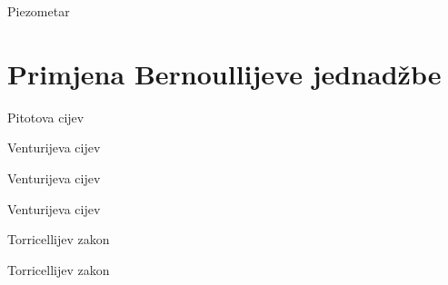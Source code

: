 \documentclass[croatian]{beamer}
\begin{document}
\begin{frame}{Piezometar}

\begin{figure}
\end{figure}
\end{frame}

\section{Primjena Bernoullijeve jednadžbe}

\begin{frame}{Pitotova cijev}

\begin{figure}
\end{figure}
\end{frame}

\begin{frame}{Venturijeva cijev}

\begin{figure}
\end{figure}
\end{frame}

\begin{frame}{Venturijeva cijev}

\begin{figure}
\end{figure}
\end{frame}

\begin{frame}{Venturijeva cijev}

\begin{figure}
\end{figure}
\end{frame}

\begin{frame}{Torricellijev zakon}

\begin{figure}
\end{figure}
\end{frame}

\begin{frame}{Torricellijev zakon}

\begin{figure}
\end{figure}
\end{frame}
\end{document}
